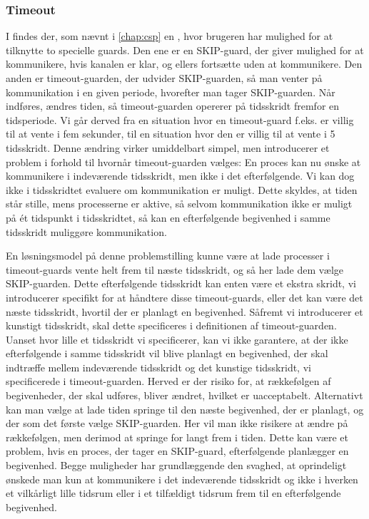 \subsubsection{Timeout} 
I \pycsp findes der, som nævnt i \autoref{chap:csp} en , hvor brugeren har mulighed for at tilknytte to specielle guards. Den ene er en SKIP-guard, der giver mulighed for at kommunikere, hvis kanalen er klar, og ellers fortsætte uden at kommunikere. Den anden er timeout-guarden, der udvider SKIP-guarden, så man venter på kommunikation i en given periode, hvorefter man tager SKIP-guarden. 
Når \des indføres, ændres tiden, så timeout-guarden opererer på tidsskridt fremfor en tidsperiode. Vi går derved fra en situation hvor en timeout-guard f.eks. er villig til at vente i fem sekunder, til en situation hvor den er villig til at vente i 5 tidsskridt. Denne ændring virker umiddelbart simpel, men introducerer et problem i forhold til hvornår timeout-guarden vælges: En proces kan nu ønske at kommunikere i indeværende tidsskridt, men ikke i det efterfølgende. Vi kan dog ikke i tidsskridtet evaluere om kommunikation er muligt. Dette skyldes, at tiden står stille, mens processerne er aktive, så selvom kommunikation ikke er muligt på ét tidspunkt i tidsskridtet, så kan en efterfølgende begivenhed i samme tidsskridt muliggøre kommunikation.


En løsningsmodel på denne problemstilling kunne være at lade processer i timeout-guards vente helt frem til næste tidsskridt, og så her lade dem vælge SKIP-guarden. Dette efterfølgende tidsskridt kan enten være et ekstra skridt, vi introducerer specifikt for at håndtere disse timeout-guards, eller det kan være det næste tidsskridt, hvortil der er planlagt en begivenhed. 
Såfremt vi introducerer et kunstigt tidsskridt, skal dette specificeres i definitionen af timeout-guarden. Uanset hvor lille et tidsskridt vi specificerer, kan vi ikke garantere, at der ikke efterfølgende i samme tidsskridt vil blive planlagt en begivenhed, der skal indtræffe mellem indeværende tidsskridt og det kunstige tidsskridt, vi specificerede i timeout-guarden. Herved er der risiko for, at rækkefølgen af begivenheder, der skal udføres, bliver ændret, hvilket er uacceptabelt. 
Alternativt kan man vælge at lade tiden springe til den næste begivenhed, der er planlagt, og der som det første vælge SKIP-guarden. Her vil man ikke risikere at ændre på rækkefølgen, men derimod at springe for langt frem i tiden. Dette kan være et problem, hvis en proces, der tager en SKIP-guard, efterfølgende planlægger en begivenhed.
Begge muligheder har grundlæggende den svaghed, at oprindeligt ønskede man kun at kommunikere i det indeværende tidsskridt og ikke i hverken et vilkårligt lille tidsrum eller i et tilfældigt tidsrum frem til en efterfølgende begivenhed.

